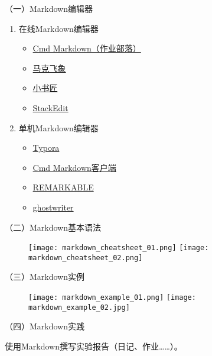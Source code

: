 \vspace{0.1in}
（一）Markdown编辑器
\begin{enumerate}
  \item 在线Markdown编辑器
\begin{itemize}
  \item \href{https://www.zybuluo.com}{Cmd Markdown（作业部落）}
  \item \href{https://maxiang.io}{马克飞象}
  \item \href{http://markdown.xiaoshujiang.com/}{小书匠}
  \item \href{https://stackedit.io/app}{StackEdit}
\end{itemize}
  \item 单机Markdown编辑器
    \begin{itemize}
      \item \href{https://typora.io/}{Typora}
      \item \href{https://www.zybuluo.com/cmd/}{Cmd Markdown客户端}
      \item \href{http://remarkableapp.github.io/}{REMARKABLE}
      \item \href{https://wereturtle.github.io/ghostwriter/}{ghostwriter}
    \end{itemize}
\end{enumerate}

\vspace{0.1in}
（二）Markdown基本语法
\begin{figure}[h]
  \centering
  \texttt{[image: markdown\_cheatsheet\_01.png]}
  \texttt{[image: markdown\_cheatsheet\_02.png]}
\end{figure}

\vspace{0.1in}
（三）Markdown实例
\begin{figure}[h]
  \centering
  \texttt{[image: markdown\_example\_01.png]}
  \texttt{[image: markdown\_example\_02.jpg]}
\end{figure}

\vspace{0.1in}
（四）Markdown实践

使用Markdown撰写实验报告（日记、作业……）。
